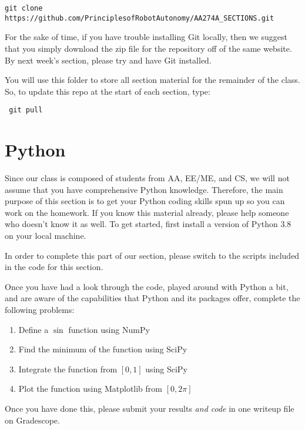 \documentclass{article}
\begin{document}
 \begin{lstlisting}[escapechar=|]
 git clone https://github.com/PrinciplesofRobotAutonomy/AA274A_SECTIONS.git
\end{lstlisting}
For the sake of time, if you have trouble installing Git locally, then we suggest that you simply download the zip file for the repository off of the same website. By next week's section, please try and have Git installed.

You will use this folder to store all section material for the remainder of the class. So, to update this repo at the start of each section, type: 

 \begin{lstlisting}
 git pull
\end{lstlisting}


\section{Python}
Since our class is composed of students from AA, EE/ME, and CS, we will not assume that you have comprehensive Python knowledge. Therefore, the main purpose of this section is to get your Python coding skills spun up so you can work on the homework. If you know this material already, please help someone who doesn't know it as well. To get started, first install a version of Python 3.8 on your local machine. 

In order to complete this part of our section, please switch to the scripts included in the code for this section.


Once you have had a look through the code, played around with Python a bit, and are aware of the capabilities that Python and its packages offer, complete the following problems:
{\bf
\begin{enumerate}
\item Define a $\sin$ function using NumPy
\item Find the minimum of the function using SciPy
\item Integrate the function from $[0, 1]$ using SciPy
\item Plot the function using Matplotlib from $[0, 2\pi]$
\end{enumerate}
}
Once you have done this, please submit your results \textit{and code} in one writeup file on Gradescope.
\end{document}
